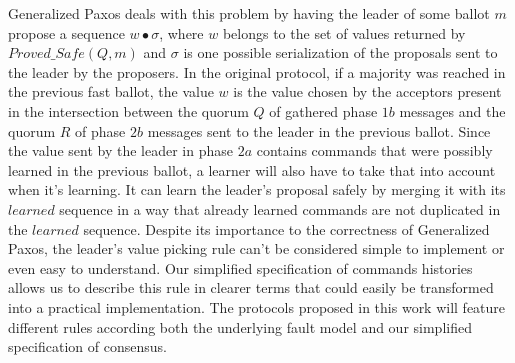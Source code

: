 Generalized Paxos deals with this problem by having the leader of some ballot $m$ propose a sequence $w \bullet \sigma$, where $w$ belongs to the set of values returned by $Proved\_Safe(Q,m)$ and $\sigma$ is one possible serialization of the proposals sent to the leader by the proposers. In the original protocol, if a majority was reached in the previous fast ballot, the value $w$ is the value chosen by the acceptors present in the intersection between the quorum $Q$ of gathered phase $1b$ messages and the quorum $R$ of phase $2b$ messages sent to the leader in the previous ballot. Since the value sent by the leader in phase $2a$ contains commands that were possibly learned in the previous ballot, a learner will also have to take that into account when it's learning. It can learn the leader's proposal safely by merging it with its $learned$ sequence in a way that already learned commands are not duplicated in the $learned$ sequence. Despite its importance to the correctness of Generalized Paxos, the leader's value picking rule can't be considered simple to implement or even easy to understand. Our simplified specification of commands histories allows us to describe this rule in clearer terms that could easily be transformed into a practical implementation. The protocols proposed in this work will feature different rules according both the underlying fault model and our simplified specification of consensus. 

